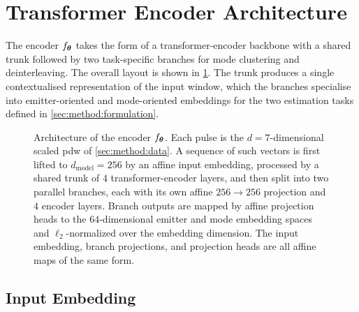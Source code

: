 \section{Transformer Encoder Architecture}\label{sec:method:arch}

The encoder $f_{\bm{\theta}}$ takes the form of a transformer-encoder backbone \parencite{vaswani2017attention} with a shared trunk followed by two task-specific branches for mode clustering and deinterleaving. The overall layout is shown in \cref{fig:method:arch}.
The trunk produces a single contextualised representation of the input window, which the branches specialise into emitter-oriented and mode-oriented embeddings for the two estimation tasks defined in \cref{sec:method:formulation}.

\begin{figure}[tbp]
  \centering
  
  \caption{Architecture of the encoder $f_{\bm{\theta}}$. Each pulse is the $d=7$-dimensional scaled \gls{pdw} of \cref{sec:method:data}. A sequence of such vectors is first lifted to $d_{\mathrm{model}}=256$ by an affine input embedding, processed by a shared trunk of $4$ transformer-encoder layers, and then split into two parallel branches, each with its own affine $256\!\to\!256$ projection and $4$ encoder layers. Branch outputs are mapped by affine projection heads to the $64$-dimensional emitter and mode embedding spaces and $\ell_2$-normalized over the embedding dimension. The input embedding, branch projections, and projection heads are all affine maps of the same form.}
  \label{fig:method:arch}
\end{figure}

\subsection*{Input Embedding}

